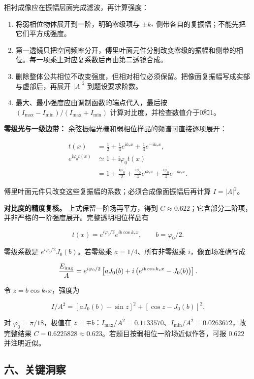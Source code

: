 \documentclass[12pt,a4paper,UTF8]{ctexart}
\newcommand{\tightlist}{\setlength{\itemsep}{0pt}\setlength{\parskip}{0pt}}
\begin{document}
相衬成像应在振幅层面完成滤波，再计算强度：

\begin{enumerate}
\def\labelenumi{\arabic{enumi}.}
\tightlist
\item
  将弱相位物体展开到一阶，明确零级项与 \(\pm k_*\)
  侧带各自的复振幅；不能先把它们平方成强度。
\item
  第一透镜只把空间频率分开，傅里叶面元件分别改变零级的振幅和侧带的相位。每一项乘上对应复系数后再由第二透镜合成。
\item
  删除整体公共相位不改变强度，但相对相位必须保留。把像面复振幅写成实部与虚部后，再展开
  \(|A|^2\) 到题设要求阶数。
\item
  最大、最小强度应由调制函数的端点代入，最后按
  \((I_{\max}-I_{\min})/(I_{\max}+I_{\min})\)
  计算对比度，并检查数值介于0和1。
\end{enumerate}

\textbf{零级光与一级边带：}
余弦振幅光栅和弱相位样品的频谱可直接逐项展开：

\[\begin{aligned}
t(x)&=\frac12+\frac14e^{\mathrm ik_*x}
+\frac14e^{-\mathrm ik_*x},\\
e^{\mathrm i\varphi_0t(x)}
&\simeq1+\mathrm i\varphi_0t(x)\\
&=1+\frac{\mathrm i\varphi_0}{2}
+\frac{\mathrm i\varphi_0}{4}e^{\mathrm ik_*x}
+\frac{\mathrm i\varphi_0}{4}e^{-\mathrm ik_*x}.
\end{aligned}\]

傅里叶面元件只改变这些复振幅的系数；必须合成像面振幅后再计算
\(I=|A|^2\)。

\textbf{对比度的精度复核。} 上式保留一阶场再平方，得到
\(C\approx0.622\)；它含部分二阶项，并非严格的一阶强度展开。完整透明相位样品有

\[t(x)=e^{i\varphi_0/2}e^{ib\cos k_*x},\qquad b=\varphi_0/2.\]

零级系数是 \(e^{i\varphi_0/2}J_0(b)\)。若零级乘 \(a=1/4\)、所有非零级乘
\(i\)，像面场准确写成

\[\frac{E_{\rm img}}A=e^{i\varphi_0/2}\left[aJ_0(b)+i\left(e^{ib\cos k_*x}-J_0(b)\right)\right].\]

令 \(z=b\cos k_*x\)，强度为

\[I/A^2=[aJ_0(b)-\sin z]^2+[\cos z-J_0(b)]^2.\]

对 \(\varphi_0=\pi/18\)，极值在
\(z=\mp b\)：\(I_{\max}/A^2=0.1133570\)、\(I_{\min}/A^2=0.0263672\)，故完整结果
\(C=0.6225828\approx0.623\)。若题目按弱相位一阶场近似作答，可报
\(0.622\) 并注明近似。

\subsection{六、关键洞察}\label{ux516dux5173ux952eux6d1eux5bdf-6}
\end{document}
